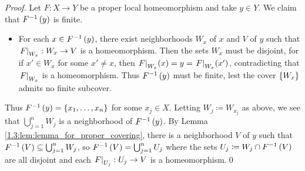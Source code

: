 \documentclass[../Moduli_Spaces_of_Riemann_Surfaces.tex]{subfiles}
\begin{document}
    \begin{proof}
        Let $F:X\to Y$ be a proper local homeomorphism and take $y\in Y$. We claim that $F^{-1}\left(y\right)$ is finite.
        \begin{itemize}
            \item For each $x\in F^{-1}\left(y\right)$, there exist neighborhoods $W_x$ of $x$ and $V$ of $y$ such that $\left.F\right|_{W_x}:W_x\to V$ is a homeomorphism. Then the sets $W_x$ must be disjoint, for if $x'\in W_x$ for some $x'\neq x$, then $\left.F\right|_{W_x}\!\left(x\right)=y=\left.F\right|_{W_x}\!\left(x'\right)$, contradicting that $\left.F\right|_{W_x}$ is a homeomorphism. Thus $F^{-1}\left(y\right)$ must be finite, lest the cover $\left\{W_x\right\}$ admits no finite subcover.
        \end{itemize}
        Thus $F^{-1}\left(y\right)=\left\{x_1,\dots,x_n\right\}$ for some $x_j\in X$. Letting $W_j\coloneqq W_{x_j}$ as above, we see that $\bigcup_{j=1}^{n}W_j$ is a neighborhood of $F^{-1}\left(y\right)$. By Lemma \ref{1.3:lem:lemma_for_proper_covering}, there is a neighborhood $V$ of $y$ such that $F^{-1}\left(V\right)\subseteq\bigcup_{j=1}^{n}W_j$, so $F^{-1}\left(V\right)=\bigcup_{j=1}^{n}U_j$ where the sets $U_j\coloneqq W_j\cap F^{-1}\left(V\right)$ are all disjoint and each $\left.F\right|_{U_j}:U_j\to V$ is a homeomorphism.\qed
    \end{proof}
\end{document}
